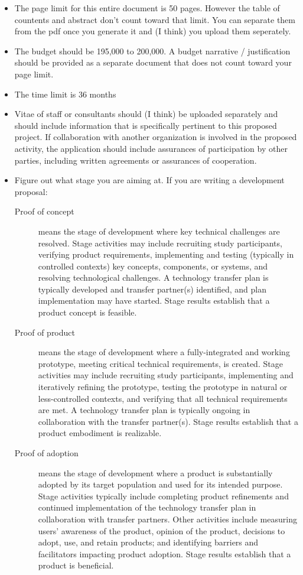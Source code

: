 \begin{itemize}
    \item The page limit for this entire document is 50 pages. However the table of countents and abstract don't count toward that limit. You can separate them from the pdf once you generate it and (I think) you upload them seperately.
    \item The budget should be 195,000 to 200,000. A budget narrative / justification should be provided as a separate document that does not count toward your page limit. 
    \item The time limit is 36 months
    \item Vitae of staff or consultants should (I think) be uploaded separately and should include information that is specifically pertinent to this proposed project. If collaboration with another organization is involved in the proposed activity, the application should include assurances of participation by other parties, including written agreements or assurances of cooperation.
    \item Figure out what stage you are aiming at. If you are writing a development proposal:
    \begin{description}
    \item[Proof of concept] means the stage of development where key technical challenges are resolved. Stage activities may include recruiting study participants, verifying product requirements, implementing and testing (typically in controlled contexts) key concepts, components, or systems, and resolving technological challenges. A technology transfer plan is typically developed and transfer partner(s) identified, and plan implementation may have started. Stage results establish that a product concept is feasible.
    \item[Proof of product] means the stage of development where a fully-integrated and working prototype, meeting critical technical requirements, is created. Stage activities may include recruiting study participants, implementing and iteratively refining the prototype, testing the prototype in natural or less-controlled contexts, and verifying that all technical requirements are met. A technology transfer plan is typically ongoing in collaboration with the transfer partner(s). Stage results establish that a product embodiment is realizable.
    \item[ Proof of adoption ] means the stage of development where a product is substantially adopted by its target population and used for its intended purpose. Stage activities typically include completing product refinements and continued implementation of the technology transfer plan in collaboration with transfer partners. Other activities include measuring users’ awareness of the product, opinion of the product, decisions to adopt, use, and retain products; and identifying barriers and facilitators impacting product adoption. Stage results establish that a product is beneficial.

\end{description}
\end{itemize}
